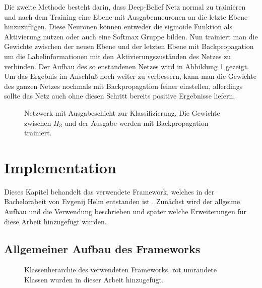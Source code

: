 \documentclass[12pt]{article}
\begin{document}
Die zweite Methode besteht darin, dass Deep-Belief Netz normal zu trainieren und nach dem Training eine Ebene mit Ausgabenneuronen an die letzte Ebene hinzuzufügen. Diese Neuronen können entweder die sigmoide Funktion als Aktivierung nutzen oder auch eine Softmax Gruppe bilden. Nun trainiert man die Gewichte zwischen der neuen Ebene und der letzten Ebene mit Backpropagation um die Labelinformationen mit den Aktivierungszuständen des Netzes zu verbinden. Der Aufbau des so enstandenen Netzes wird in Abbildung \ref{BPTrain} gezeigt. Um das Ergebnis im Anschluß noch weiter zu verbessern, kann man die Gewichte des ganzen Netzes nochmals mit Backpropagation feiner einstellen, allerdings sollte das Netz auch ohne diesen Schritt bereits positive Ergebnisse liefern\cite{backprop}.

\begin{figure}[H]
	\center
	
	\caption{Netzwerk mit Ausgabeschicht zur Klassifizierung. Die Gewichte zwischen $H_3$ und der Ausgabe werden mit Backpropagation trainiert.}
	\label{BPTrain}
\end{figure}


\section{Implementation}
Dieses Kapitel behandelt das verwendete Framework, welches in der Bachelorabeit von Evgenij Helm entstanden ist \cite{Helm}. Zunächst wird der allgeime Aufbau und die Verwendung beschrieben und später welche Erweiterungen für diese Arbeit hinzugefügt wurden.
\subsection{Allgemeiner Aufbau des Frameworks}
\begin{figure}[H]
	\center
	
	\caption{Klassenherarchie des verwendeten Frameworks, rot umrandete Klassen wurden in dieser Arbeit hinzugefügt.}
	\label{Aufbau}
\end{figure}
\end{document}
